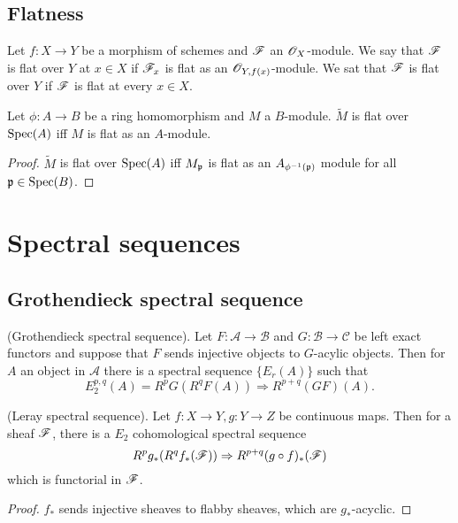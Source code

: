 \documentclass{memoir}
\begin{document}
\section{Flatness}
\begin{definition}
    Let $f:X\to Y$ be a morphism of schemes and $\mathscr{F}$ an $\mathscr{O}_X$-module.
    We say that $\mathscr{F}$ is flat over $Y$ at $x\in X$ if $\mathscr{F}_x$ is flat as an $\mathscr{O}_{Y,f(x)}$-module.
    We sat that $\mathscr{F}$ is flat over $Y$ if $\mathscr{F}$ is flat at every $x\in X$.
\end{definition}
\begin{proposition}
    Let $\phi:A\to B$ be a ring homomorphism and $M$ a $B$-module.
    $\tilde M$ is flat over $\operatorname{Spec}(A)$ iff $M$ is flat as an $A$-module.
\end{proposition}
\begin{proof}
    $\tilde M$ is flat over $\operatorname{Spec}(A)$ iff $M_{\mathfrak{p}}$ is flat as an $A_{\phi^{-1}(\mathfrak{p})}$ module for all $\mathfrak{p}\in \operatorname{Spec}(B)$.
\end{proof}
\chapter{Spectral sequences}
\section{Grothendieck spectral sequence}
\begin{thm}
    (Grothendieck spectral sequence).
    Let $F:\mathcal A \to \mathcal B$ and $G:\mathcal B \to \mathcal C$ be left exact functors and suppose that $F$ sends injective objects to $G$-acylic objects.
    Then for $A$ an object in $\mathcal A$ there is a spectral sequence $\{E_r(A)\}$ such that 
    \begin{equation}
        E_2^{p,q}(A) = R^pG(R^qF(A)) \Rightarrow R^{p+q}(GF)(A).
    \end{equation}
\end{thm}
\begin{corollary}
    (Leray spectral sequence).
    Let $f:X\to Y, g:Y\to Z$ be continuous maps.
    Then for a sheaf $\mathscr{F}$, there is a $E_2$ cohomological spectral sequence
    \begin{equation}
        R^pg_*(R^qf_*(\mathscr{F})) \Rightarrow R^{p+q}(g\circ f)_*(\mathscr{F})
    \end{equation}
    which is functorial in $\mathscr{F}$.
\end{corollary}
\begin{proof}
    $f_*$ sends injective sheaves to flabby sheaves, which are $g_*$-acyclic.
\end{proof}
\end{document}
